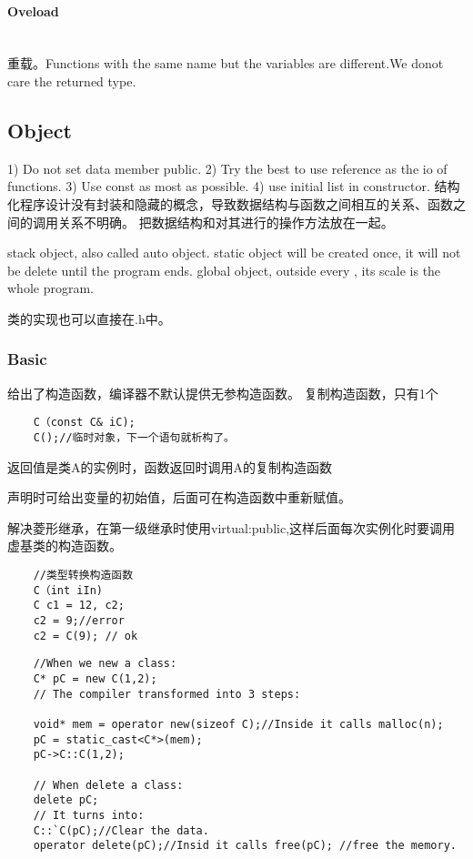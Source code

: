 \documentclass[UTF8]{../computerUniverse}
\begin{document}
\paragraph{Oveload} \quad\\
重载。Functions with the same name but the variables are different.We donot care the returned type.




\subsection{Object}

1) Do not set data member public.
2) Try the best to use reference as the io of functions.
3) Use const as most as possible.
4) use initial list in constructor.
结构化程序设计没有封装和隐藏的概念，导致数据结构与函数之间相互的关系、函数之间的调用关系不明确。
把数据结构和对其进行的操作方法放在一起。

stack object, also called auto object. 
static object will be created once, it will not be delete until the program ends.
global object, outside every {}, its scale is the whole program.

类的实现也可以直接在.h中。
\subsubsection{Basic}
给出了构造函数，编译器不默认提供无参构造函数。
复制构造函数，只有1个
\begin{lstlisting}
    C（const C& iC);
    C();//临时对象，下一个语句就析构了。
\end{lstlisting}
返回值是类A的实例时，函数返回时调用A的复制构造函数

声明时可给出变量的初始值，后面可在构造函数中重新赋值。


解决菱形继承，在第一级继承时使用virtual:public,这样后面每次实例化时要调用虚基类的构造函数。
\begin{lstlisting}
    //类型转换构造函数
    C（int iIn)
    C c1 = 12, c2;
    c2 = 9;//error
    c2 = C(9); // ok
\end{lstlisting}



\begin{lstlisting}
    //When we new a class: 
    C* pC = new C(1,2);
    // The compiler transformed into 3 steps:

    void* mem = operator new(sizeof C);//Inside it calls malloc(n);
    pC = static_cast<C*>(mem);
    pC->C::C(1,2);

    // When delete a class:
    delete pC;
    // It turns into:
    C::`C(pC);//Clear the data.
    operator delete(pC);//Insid it calls free(pC); //free the memory.
\end{lstlisting}
\end{document}
